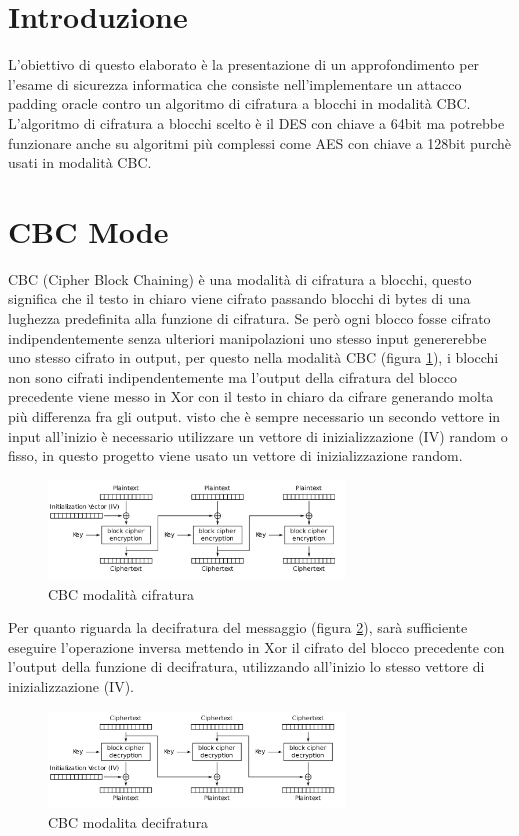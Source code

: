 \section{Introduzione}
L'obiettivo di questo elaborato è la presentazione di un approfondimento per l'esame di sicurezza informatica che consiste nell'implementare 
un attacco padding oracle contro un algoritmo di cifratura a blocchi in modalità CBC.
L'algoritmo di cifratura a blocchi scelto è il DES con chiave a 64bit ma potrebbe funzionare anche 
su algoritmi più complessi come AES con chiave a 128bit purchè usati in modalità CBC.
\section{CBC Mode}

CBC (Cipher Block Chaining) è una modalità di cifratura a blocchi, questo significa che il testo in chiaro viene cifrato passando blocchi di bytes di una 
lughezza predefinita alla funzione di cifratura. Se però ogni blocco fosse cifrato indipendentemente senza ulteriori manipolazioni uno stesso 
input genererebbe uno stesso cifrato in output, per questo nella modalità CBC (figura \ref{fig:cbc_enc}), i blocchi non sono cifrati indipendentemente ma 
l'output della cifratura del blocco precedente viene messo in Xor con il testo in chiaro da cifrare generando molta più differenza fra gli output.
visto che è sempre necessario un secondo vettore in input all'inizio è necessario utilizzare un vettore di inizializzazione (IV) random o fisso, in questo progetto viene usato 
un vettore di inizializzazione random.
\begin{figure}[h!]
    \includegraphics[width=0.7\textwidth]{img/CBC_encr.png}
    \centering
    \caption{CBC modalità cifratura}
    \label{fig:cbc_enc}
\end{figure}

Per quanto riguarda la decifratura del messaggio (figura \ref{fig:cbc_decr}), sarà sufficiente eseguire l'operazione inversa mettendo in Xor il cifrato del blocco precedente con l'output della funzione di decifratura, 
utilizzando all'inizio lo stesso vettore di inizializzazione (IV).

\begin{figure}[h!]
    \includegraphics[width=0.7\textwidth]{img/CBC_decr.png}
    \centering
    \caption{CBC modalita decifratura}
    \label{fig:cbc_decr}
\end{figure}

